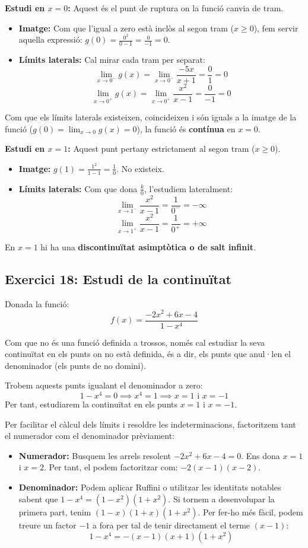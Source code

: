 \documentclass[12pt,a4paper]{article}
\begin{document}
\textbf{Estudi en $x = 0$:}
Aquest és el punt de ruptura on la funció canvia de tram.
\begin{itemize}
    \item \textbf{Imatge:} Com que l'igual a zero està inclòs al segon tram ($x \ge 0$), fem servir aquella expressió: $g(0) = \frac{0^2}{0 - 1} = \frac{0}{-1} = 0$.
    \item \textbf{Límits laterals:} Cal mirar cada tram per separat:
    \[ \lim_{x \to 0^-} g(x) = \lim_{x \to 0^-} \frac{-5x}{x+1} = \frac{0}{1} = 0 \]
    \[ \lim_{x \to 0^+} g(x) = \lim_{x \to 0^+} \frac{x^2}{x-1} = \frac{0}{-1} = 0 \]
\end{itemize}
Com que els límits laterals existeixen, coincideixen i són iguals a la imatge de la funció ($g(0) = \lim_{x \to 0} g(x) = 0$), la funció és \textbf{contínua} en $x = 0$.

\textbf{Estudi en $x = 1$:}
Aquest punt pertany estrictament al segon tram ($x \ge 0$).
\begin{itemize}
    \item \textbf{Imatge:} $g(1) = \frac{1^2}{1-1} = \frac{1}{0}$. No existeix.
    \item \textbf{Límits laterals:} Com que dona $\frac{k}{0}$, l'estudiem lateralment:
    \[ \lim_{x \to 1^-} \frac{x^2}{x-1} = \frac{1}{0^-} = -\infty \]
    \[ \lim_{x \to 1^+} \frac{x^2}{x-1} = \frac{1}{0^+} = +\infty \]
\end{itemize}
En $x = 1$ hi ha una \textbf{discontinuïtat asimptòtica o de salt infinit}.

\vspace{1cm}

\subsection*{Exercici 18: Estudi de la continuïtat}

Donada la funció:
\[ f(x) = \frac{-2x^2 + 6x - 4}{1 - x^4} \]

Com que no és una funció definida a trossos, només cal estudiar la seva continuïtat en els punts on no està definida, és a dir, els punts que anul·len el denominador (els punts de no domini).

Trobem aquests punts igualant el denominador a zero:
\[ 1 - x^4 = 0 \implies x^4 = 1 \implies x = 1 \text{ i } x = -1 \]
Per tant, estudiarem la continuïtat en els punts $x = 1$ i $x = -1$.

Per facilitar el càlcul dels límits i resoldre les indeterminacions, factoritzem tant el numerador com el denominador prèviament:
\begin{itemize}
    \item \textbf{Numerador:} Busquem les arrels resolent $-2x^2 + 6x - 4 = 0$. Ens dona $x=1$ i $x=2$. Per tant, el podem factoritzar com: $-2(x - 1)(x - 2)$.
    \item \textbf{Denominador:} Podem aplicar Ruffini o utilitzar les identitats notables sabent que $1 - x^4 = (1 - x^2)(1 + x^2)$. Si tornem a desenvolupar la primera part, tenim $(1 - x)(1 + x)(1 + x^2)$. Per fer-ho més fàcil, podem treure un factor $-1$ a fora per tal de tenir directament el terme $(x - 1)$:
    \[ 1 - x^4 = -(x - 1)(x + 1)(1 + x^2) \]
\end{itemize}
\end{document}
